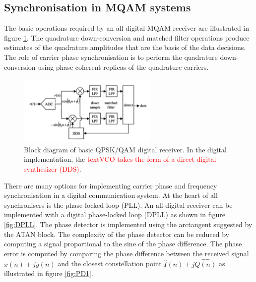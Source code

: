 \documentclass[12pt,a4paper,openright]{report}
\begin{document}
\subsection{Synchronisation in MQAM systems}
\label{subsec:MQAMsynch}
The basic operations required by an all digital MQAM receiver are illustrated in figure \ref{fig:rxMQAM}. The quadrature down-conversion and matched filter operations produce estimates of the quadrature amplitudes that are the basis of the data decisions. The role of carrier phase synchronisation is to perform the quadrature down-conversion using phase coherent replicas of the quadrature carriers.

 \begin{figure}[H]
  \centering
    \includegraphics[width=0.6\textwidth]{rxMQAM.pdf}
    \caption[Block diagram of basic QPSK/QAM digital receiver]{Block diagram of basic QPSK/QAM digital receiver. In the digital implementation, the \textcolor{red}{textVCO takes the form of a direct digital synthesizer (DDS)}. }
    \label{fig:rxMQAM}
\end{figure}

There are many options for implementing carrier phase and frequency synchronisation in a digital communication system. At the heart of all synchronisers is the phase-locked loop (PLL). An all-digital receiver can be implemented with a digital phase-locked loop (DPLL) as shown in figure \ref{fig:DPLL}. The phase detector is implemented using the arctangent suggested by the ATAN block. The complexity of the phase detector can be reduced by computing a signal proportional to the sine of the phase difference. The phase error is computed by comparing the phase difference between the received signal $x(n) + jy(n)$ and the closest constellation point $\hat{I}(n) + j\hat{Q(n)}$ as illustrated in figure \ref{fig:PD1}.
\end{document}
